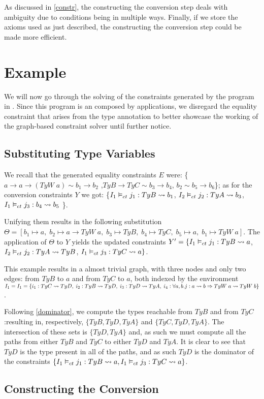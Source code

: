 As discussed in \ref{constr}, the constructing the conversion step deals with ambiguity due to conditions being in multiple ways. Finally, if we store the axioms used as just described, the constructing the conversion step could be made more efficient.



\section{Example}
We will now go through the solving of the constraints generated by the program in . Since this program is an composed by applications, we disregard the equality constraint that arises from the type annotation to better showcase the working of the graph-based constraint solver until further notice.
\subsection{Substituting Type Variables}
We recall that the generated equality constraints $E$ were: \{$a \to a \to (TyW \; a) \sim b_1 \to b_2$ ,$TyB \to TyC \sim b_3 \to b_4$, $b_2 \sim b_5 \to b_6$\}; as for the conversion constraints $Y$ we got: \{${I_1} \vDash_{ct} {j_1}: {TyB} \rightsquigarrow {b_1}$, ${I_2} \vDash_{ct} {j_2}: {TyA} \rightsquigarrow {b_3}$, ${I_1} \vDash_{ct} {j_3}: {b_4} \rightsquigarrow {b_5}$ \}.

Unifying them results in the following substitution $\Theta= [b_1 \mapsto a, \;b_2 \mapsto a \to TyW\;a, \;b_3 \mapsto TyB, \;b_4 \mapsto TyC, \;b_5 \mapsto a, \;b_1 \mapsto TyW \;a]$. The application of $\Theta$ to $Y$ yields the updated constraints $Y' = \{{I_1} \vDash_{ct} {j_1}: {TyB} \rightsquigarrow {a}$, ${I_2} \vDash_{ct} {j_2}: {TyA} \rightsquigarrow {TyB}$, ${I_1} \vDash_{ct} {j_3}: {TyC} \rightsquigarrow {a} \}$.

This example results in a almost trivial graph, with three nodes and only two edges: from $TyB$ to $a$ and from $TyC$ to $a$, both indexed by the environment $I_1 = I_1 = \{i_1 : TyC \rightsquigarrow TyD, \;i_2 : TyB \rightsquigarrow TyD,\; i_3 : TyD \rightsquigarrow TyA,\;i_4 :\forall a, b . j : a \rightsquigarrow b \Rightarrow TyW\;a\rightsquigarrow TyW\;b\}$.

Following \ref{dominator}, we compute the types reachable from $TyB$ and from $TyC$:resulting in, respectively, $\{ TyB, TyD, TyA\}$ and $\{TyC, TyD,TyA \}$. The intersection of these sets is  $\{ TyD, TyA\}$ and, as such we must compute all the paths from either $TyB$ and $TyC$ to either  $TyD$ and $TyA$. It is clear to see that $TyD$ is the type present in all of the paths, and as such $TyD$ is the dominator of the constraints $\{{I_1} \vDash_{ct} {j_1}: {TyB} \rightsquigarrow {a}, {I_1} \vDash_{ct} {j_3}: {TyC} \rightsquigarrow {a} \}$.
\subsection{Constructing the Conversion}
